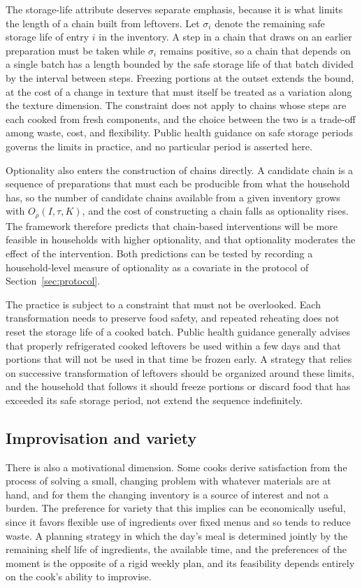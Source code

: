 \documentclass[11pt]{article}
\theoremstyle{remark}
\begin{document}
The storage-life attribute deserves separate emphasis, because it is what limits the length of a chain built from leftovers. Let $\sigma_i$ denote the remaining safe storage life of entry $i$ in the inventory. A step in a chain that draws on an earlier preparation must be taken while $\sigma_i$ remains positive, so a chain that depends on a single batch has a length bounded by the safe storage life of that batch divided by the interval between steps. Freezing portions at the outset extends the bound, at the cost of a change in texture that must itself be treated as a variation along the texture dimension. The constraint does not apply to chains whose steps are each cooked from fresh components, and the choice between the two is a trade-off among waste, cost, and flexibility. Public health guidance on safe storage periods governs the limits in practice, and no particular period is asserted here.

Optionality also enters the construction of chains directly. A candidate chain is a sequence of preparations that must each be producible from what the household has, so the number of candidate chains available from a given inventory grows with $O_\rho(I, \tau, K)$, and the cost of constructing a chain falls as optionality rises. The framework therefore predicts that chain-based interventions will be more feasible in households with higher optionality, and that optionality moderates the effect of the intervention. Both predictions can be tested by recording a household-level measure of optionality as a covariate in the protocol of Section~\ref{sec:protocol}.

The practice is subject to a constraint that must not be overlooked. Each transformation needs to preserve food safety, and repeated reheating does not reset the storage life of a cooked batch. Public health guidance generally advises that properly refrigerated cooked leftovers be used within a few days and that portions that will not be used in that time be frozen early. A strategy that relies on successive transformation of leftovers should be organized around these limits, and the household that follows it should freeze portions or discard food that has exceeded its safe storage period, not extend the sequence indefinitely.

\subsection{Improvisation and variety}

There is also a motivational dimension. Some cooks derive satisfaction from the process of solving a small, changing problem with whatever materials are at hand, and for them the changing inventory is a source of interest and not a burden. The preference for variety that this implies can be economically useful, since it favors flexible use of ingredients over fixed menus and so tends to reduce waste. A planning strategy in which the day's meal is determined jointly by the remaining shelf life of ingredients, the available time, and the preferences of the moment is the opposite of a rigid weekly plan, and its feasibility depends entirely on the cook's ability to improvise.
\end{document}
